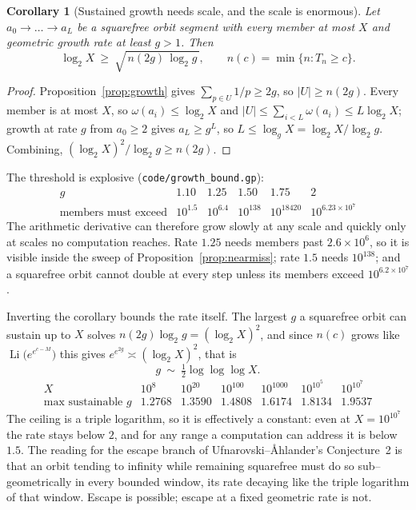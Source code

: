 \documentclass[11pt]{article}
\newtheorem{corollary}[theorem]{Corollary}
\theoremstyle{definition}
\begin{document}
\begin{corollary}[Sustained growth needs scale, and the scale is enormous]\label{cor:growthscale}
Let $a_0\to\dots\to a_L$ be a squarefree orbit segment with every member at most $X$ and geometric
growth rate at least $g>1$. Then
\[ \log_2X\ \ge\ \sqrt{\,n(2g)\,\log_2 g\,},\qquad n(c)=\min\{n:T_n\ge c\}. \]
\end{corollary}
\begin{proof}
Proposition~\ref{prop:growth} gives $\sum_{p\in U}1/p\ge2g$, so $|U|\ge n(2g)$. Every member is at
most $X$, so $\omega(a_i)\le\log_2X$ and $|U|\le\sum_{i<L}\omega(a_i)\le L\log_2X$; growth at rate
$g$ from $a_0\ge2$ gives $a_L\ge g^{L}$, so $L\le\log_gX=\log_2X/\log_2g$. Combining,
$(\log_2X)^2/\log_2g\ge n(2g)$.
\end{proof}

The threshold is explosive \textup{(\texttt{code/growth\_bound.gp})}:
\[
\begin{array}{l|ccccc}
g & 1.10 & 1.25 & 1.50 & 1.75 & 2\\\hline
\text{members must exceed} & 10^{1.5} & 10^{6.4} & 10^{138} & 10^{18420} &
 10^{6.23\times10^{7}}
\end{array}
\]
The arithmetic derivative can therefore grow slowly at any scale and quickly only at scales no
computation reaches. Rate $1.25$ needs members past $2.6\times10^{6}$, so it is visible inside the
sweep of Proposition~\ref{prop:nearmiss}; rate $1.5$ needs $10^{138}$; and a squarefree orbit cannot
double at every step unless its members exceed $10^{6.2\times10^{7}}$.

Inverting the corollary bounds the rate itself. The largest $g$ a squarefree orbit can sustain up to
$X$ solves $n(2g)\log_2g=(\log_2X)^2$, and since $n(c)$ grows like
$\operatorname{Li}\bigl(e^{e^{c-M}}\bigr)$ this gives $e^{e^{2g}}\asymp(\log_2X)^2$, that is
\[ g\ \sim\ \tfrac12\log\log\log X . \]
\[
\begin{array}{l|cccccc}
X & 10^{8} & 10^{20} & 10^{100} & 10^{1000} & 10^{10^{5}} & 10^{10^{7}}\\\hline
\text{max sustainable }g & 1.2768 & 1.3590 & 1.4808 & 1.6174 & 1.8134 & 1.9537
\end{array}
\]
The ceiling is a triple logarithm, so it is effectively a constant: even at $X=10^{10^{7}}$ the rate
stays below $2$, and for any range a computation can address it is below $1.5$. The reading for the
escape branch of Ufnarovski--\AA hlander's Conjecture~2 is that an orbit tending to infinity while
remaining squarefree must do so sub--geometrically in every bounded window, its rate decaying like
the triple logarithm of that window. Escape is possible; escape at a fixed geometric rate is not.
\end{document}
